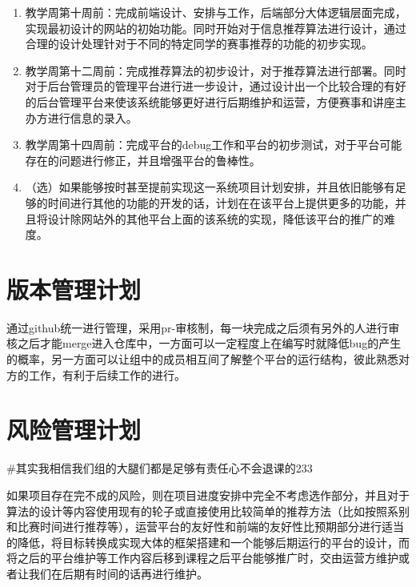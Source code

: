 \documentclass[12pt]{article}
\begin{document}
\begin{CJK}{UTF8}{gbsn}
\begin{spacing}{1.3}
\begin{enumerate}
    \item 教学周第十周前：完成前端设计、安排与工作，后端部分大体逻辑层面完成，实现最初设计的网站的初始功能。同时开始对于信息推荐算法进行设计，通过合理的设计处理针对于不同的特定同学的赛事推荐的功能的初步实现。
    
    \item 教学周第十二周前：完成推荐算法的初步设计，对于推荐算法进行部署。同时对于后台管理员的管理平台进行进一步设计，通过设计出一个比较合理的有好的后台管理平台来使该系统能够更好进行后期维护和运营，方便赛事和讲座主办方进行信息的录入。
    
    \item 教学周第十四周前：完成平台的debug工作和平台的初步测试，对于平台可能存在的问题进行修正，并且增强平台的鲁棒性。
    
    \item （选）如果能够按时甚至提前实现这一系统项目计划安排，并且依旧能够有足够的时间进行其他的功能的开发的话，计划在在该平台上提供更多的功能，并且将设计除网站外的其他平台上面的该系统的实现，降低该平台的推广的难度。
\end{enumerate}


\section{版本管理计划}
\indent\indent
通过github统一进行管理，采用pr-审核制，每一块完成之后须有另外的人进行审核之后才能merge进入仓库中，一方面可以一定程度上在编写时就降低bug的产生的概率，另一方面可以让组中的成员相互间了解整个平台的运行结构，彼此熟悉对方的工作，有利于后续工作的进行。

\section{风险管理计划}
\indent\indent
\#其实我相信我们组的大腿们都是足够有责任心不会退课的233

如果项目存在完不成的风险，则在项目进度安排中完全不考虑选作部分，并且对于算法的设计等内容使用现有的轮子或直接使用比较简单的推荐方法（比如按照系别和比赛时间进行推荐等），运营平台的友好性和前端的友好性比预期部分进行适当的降低，将目标转换成实现大体的框架搭建和一个能够后期运行的平台的设计，而将之后的平台维护等工作内容后移到课程之后平台能够推广时，交由运营方维护或者让我们在后期有时间的话再进行维护。

\end{spacing}
\end{CJK}
\end{document}
